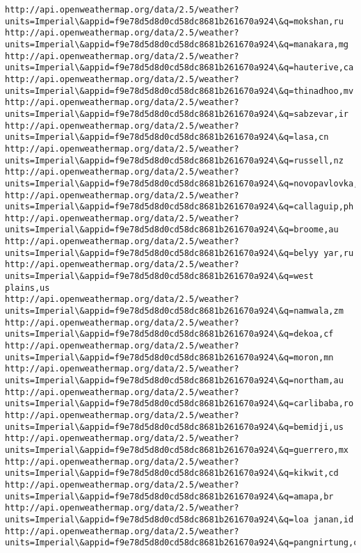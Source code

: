 \documentclass[11pt]{article}
\begin{document}
\begin{Verbatim}[commandchars=\\\{\}]
http://api.openweathermap.org/data/2.5/weather?units=Imperial\&appid=f9e78d5d8d0cd58dc8681b261670a924\&q=mokshan,ru
http://api.openweathermap.org/data/2.5/weather?units=Imperial\&appid=f9e78d5d8d0cd58dc8681b261670a924\&q=manakara,mg
http://api.openweathermap.org/data/2.5/weather?units=Imperial\&appid=f9e78d5d8d0cd58dc8681b261670a924\&q=hauterive,ca
http://api.openweathermap.org/data/2.5/weather?units=Imperial\&appid=f9e78d5d8d0cd58dc8681b261670a924\&q=thinadhoo,mv
http://api.openweathermap.org/data/2.5/weather?units=Imperial\&appid=f9e78d5d8d0cd58dc8681b261670a924\&q=sabzevar,ir
http://api.openweathermap.org/data/2.5/weather?units=Imperial\&appid=f9e78d5d8d0cd58dc8681b261670a924\&q=lasa,cn
http://api.openweathermap.org/data/2.5/weather?units=Imperial\&appid=f9e78d5d8d0cd58dc8681b261670a924\&q=russell,nz
http://api.openweathermap.org/data/2.5/weather?units=Imperial\&appid=f9e78d5d8d0cd58dc8681b261670a924\&q=novopavlovka,ru
http://api.openweathermap.org/data/2.5/weather?units=Imperial\&appid=f9e78d5d8d0cd58dc8681b261670a924\&q=callaguip,ph
http://api.openweathermap.org/data/2.5/weather?units=Imperial\&appid=f9e78d5d8d0cd58dc8681b261670a924\&q=broome,au
http://api.openweathermap.org/data/2.5/weather?units=Imperial\&appid=f9e78d5d8d0cd58dc8681b261670a924\&q=belyy yar,ru
http://api.openweathermap.org/data/2.5/weather?units=Imperial\&appid=f9e78d5d8d0cd58dc8681b261670a924\&q=west plains,us
http://api.openweathermap.org/data/2.5/weather?units=Imperial\&appid=f9e78d5d8d0cd58dc8681b261670a924\&q=namwala,zm
http://api.openweathermap.org/data/2.5/weather?units=Imperial\&appid=f9e78d5d8d0cd58dc8681b261670a924\&q=dekoa,cf
http://api.openweathermap.org/data/2.5/weather?units=Imperial\&appid=f9e78d5d8d0cd58dc8681b261670a924\&q=moron,mn
http://api.openweathermap.org/data/2.5/weather?units=Imperial\&appid=f9e78d5d8d0cd58dc8681b261670a924\&q=northam,au
http://api.openweathermap.org/data/2.5/weather?units=Imperial\&appid=f9e78d5d8d0cd58dc8681b261670a924\&q=carlibaba,ro
http://api.openweathermap.org/data/2.5/weather?units=Imperial\&appid=f9e78d5d8d0cd58dc8681b261670a924\&q=bemidji,us
http://api.openweathermap.org/data/2.5/weather?units=Imperial\&appid=f9e78d5d8d0cd58dc8681b261670a924\&q=guerrero,mx
http://api.openweathermap.org/data/2.5/weather?units=Imperial\&appid=f9e78d5d8d0cd58dc8681b261670a924\&q=kikwit,cd
http://api.openweathermap.org/data/2.5/weather?units=Imperial\&appid=f9e78d5d8d0cd58dc8681b261670a924\&q=amapa,br
http://api.openweathermap.org/data/2.5/weather?units=Imperial\&appid=f9e78d5d8d0cd58dc8681b261670a924\&q=loa janan,id
http://api.openweathermap.org/data/2.5/weather?units=Imperial\&appid=f9e78d5d8d0cd58dc8681b261670a924\&q=pangnirtung,ca

\end{Verbatim}
\end{document}
